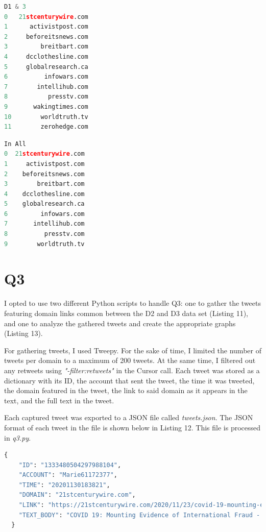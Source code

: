 \documentclass[12pt]{article}
\begin{document}
\begin{lstlisting}[language=Python, caption={Domains present in both D1 and D3}, label=lst:copy]
                 D1 & 3
0   21stcenturywire.com
1      activistpost.com
2     beforeitsnews.com
3         breitbart.com
4     dcclothesline.com
5     globalresearch.ca
6          infowars.com
7        intellihub.com
8           presstv.com
9       wakingtimes.com
10        worldtruth.tv
11        zerohedge.com
\end{lstlisting}

\begin{lstlisting}[language=Python, caption={Domains present in all data sets}, label=lst:copy]
                In All
0  21stcenturywire.com
1     activistpost.com
2    beforeitsnews.com
3        breitbart.com
4    dcclothesline.com
5    globalresearch.ca
6         infowars.com
7       intellihub.com
8          presstv.com
9        worldtruth.tv
\end{lstlisting}

\section*{Q3}

I opted to use two different Python scripts to handle Q3: one to gather the tweets featuring domain links common between the D2 and D3 data set (Listing 11), and one to analyze the gathered tweets and create the appropriate graphs (Listing 13). 

\par For gathering tweets, I used Tweepy. For the sake of time, I limited the number of tweets per domain to a maximum of 200 tweets. At the same time, I filtered out any retweets using \emph{"-filter:retweets"} in the Cursor call. Each tweet was stored as a dictionary with its ID, the account that sent the tweet, the time it was tweeted, the domain featured in the tweet, the link to said domain as it appears in the text, and the full text in the tweet. 



Each captured tweet was exported to a JSON file called \emph{tweets.json}. The JSON format of each tweet in the file is shown below in Listing 12. This file is processed in \emph{q3.py}.

\begin{lstlisting}[language=Python, caption={Example tweet gathered in JSON}, label=lst:copy]
  {
    "ID": "1333480504297988104",
    "ACCOUNT": "Marie61172377",
    "TIME": "20201130183821",
    "DOMAIN": "21stcenturywire.com",
    "LINK": "https://21stcenturywire.com/2020/11/23/covid-19-mounting-evidence-of-international-fraud/",
    "TEXT_BODY": "COVID 19: Mounting Evidence of International Fraud - 21st Century Wire https://t.co/t6SPl6F6C5"
  }
\end{lstlisting}
\end{document}
